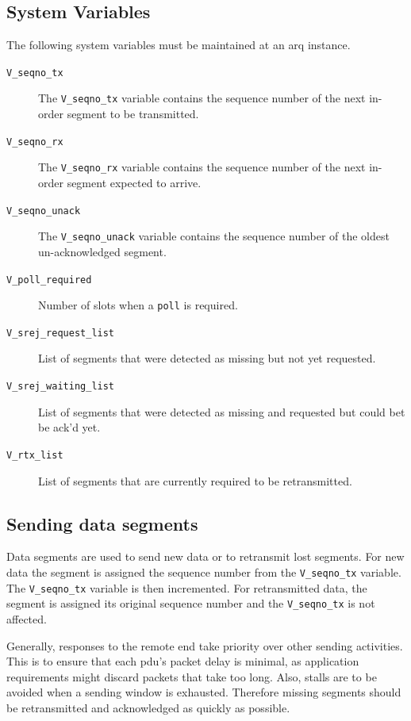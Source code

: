\documentclass[a4paper]{article}
\newcommand{\poll}{\texttt{poll}}
\newcommand{\vr}{\texttt{V\_{}seqno\_{}rx}}
\newcommand{\vs}{\texttt{V\_{}seqno\_{}tx}}
\newcommand{\va}{\texttt{V\_{}seqno\_{}unack}}
\newcommand{\pr}{\texttt{V\_{}poll\_{}required}}
\newcommand{\srejr}{\texttt{V\_{}srej\_{}request\_{}list}}
\newcommand{\srejw}{\texttt{V\_{}srej\_{}waiting\_{}list}}
\newcommand{\rtx}{\texttt{V\_{}rtx\_{}list}}
\begin{document}
	\subsection{System Variables}\label{sec:arq_variables}		
		The following system variables must be maintained at an \ac{arq} instance.			
		
		\begin{description}
			\item[\vs{}] The \vs{} variable contains the sequence number of the next in-order segment to be transmitted.
			
			\item[\vr{}] The \vr{} variable contains the sequence number of the next in-order segment expected to arrive.
			
			
			\item[\va{}] The \va{} variable contains the sequence number of the oldest un-acknowledged segment.
			
			\item[\pr{}] Number of slots when a \poll{} is required.
			
			\item[\srejr{}] List of segments that were detected as missing but not yet requested.
			
			\item[\srejw{}] List of segments that were detected as missing and requested but could bet be \ac{ack}'d yet.
			
			\item[\rtx{}] List of segments that are currently required to be retransmitted.
		\end{description}
		
	\subsection{Sending data segments}\label{sec:arq_sending}
		Data segments are used to send new data or to retransmit lost segments.
		For new data the segment is assigned the sequence number from the \vs{} variable.
		The \vs{} variable is then incremented.
		For retransmitted data, the segment is assigned its original sequence number and the \vs{} is not affected.
		
		Generally, responses to the remote end take priority over other sending activities.
		This is to ensure that each \ac{pdu}'s packet delay is minimal, as application requirements might discard packets that take too long.
		Also, stalls are to be avoided when a sending window is exhausted.
		Therefore missing segments should be retransmitted and acknowledged as quickly as possible.
		
\end{document}
